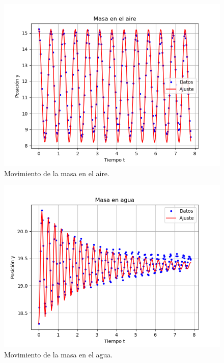 \documentclass[final,5p,times,twocolumn, nopreprintline]{elsarticle}
\numberwithin{equation}{section}
\begin{document}
\begin{figure}[h!]
\begin{center}
\includegraphics[width=\columnwidth]{../aire.png} 
\end{center}
\caption{Movimiento de la masa en el aire.}
\end{figure}\label{fig4.1}

\begin{figure}[h!]
\begin{center}
\includegraphics[width=\columnwidth]{../agua.png} 
\end{center}
\caption{Movimiento de la masa en el agua.}
\end{figure}\label{fig4.2}
\end{document}

